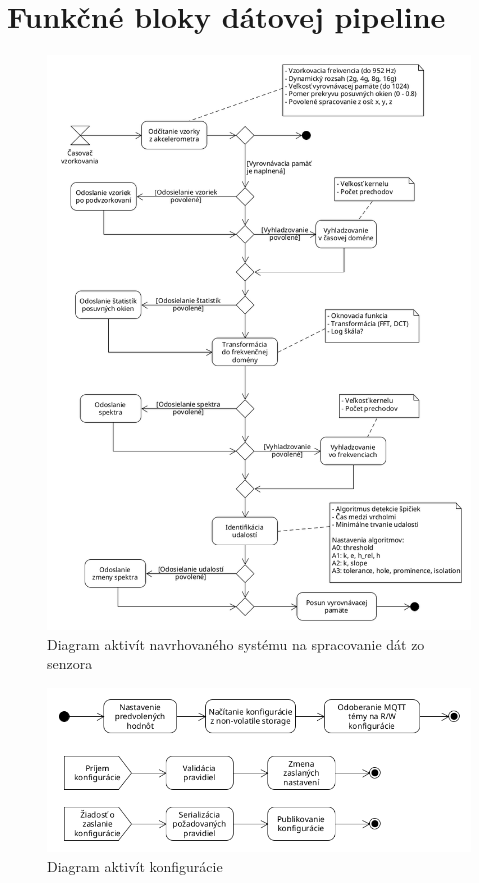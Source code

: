 \section{Funkčné bloky dátovej pipeline}

\begin{figure}[h]
	\centering
	\includegraphics[width=\textwidth]{figures/design/pipeline.png}
	\caption{Diagram aktivít navrhovaného systému na spracovanie dát zo senzora}
\end{figure}


\begin{figure}[h]
	\centering
	\includegraphics[width=\textwidth]{figures/design/configuration.png}
	\caption{Diagram aktivít konfigurácie}
\end{figure}


